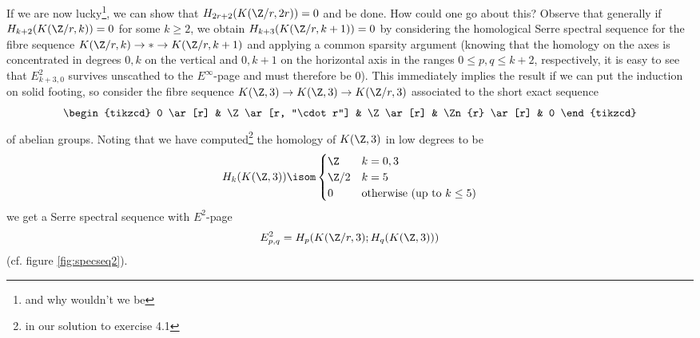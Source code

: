 \begin{solution}
	If we are now lucky\footnote{and why wouldn't we be}, we can show that $H_{2r + 2}(K(\Zn{r}, 2r)) = 0$ and be done.
	How could one go about this?
	Observe that generally if $H_{k + 2}(K(\Zn{r}, k)) = 0$ for some $k \geq 2$, we obtain $H_{k + 3}(K(\Zn{r}, k + 1)) = 0$ by considering the homological Serre spectral sequence for the fibre sequence $K(\Zn{r}, k) \to * \to K(\Zn{r}, k + 1)$ and applying a common sparsity argument (knowing that the homology on the axes is concentrated in degrees $0, k$  on the vertical and $0, k + 1$ on the horizontal axis in the ranges $0 \leq p, q \leq k + 2$, respectively, it is easy to see that $E^2_{k + 3, 0}$ survives unscathed to the $E^\infty$-page and must therefore be 0).
	This immediately implies the result if we can put the induction on solid footing, so consider the fibre sequence $K(\Z, 3) \to K(\Z, 3) \to K(\Zn{r}, 3)$ associated to the short exact sequence
	\begin{equation*}
		\begin{tikzcd}
			0 
					\ar[r]
				& \Z
					\ar[r, "\cdot r"]
				& \Z
					\ar[r]
				& \Zn{r}
					\ar[r]
				& 0
		\end{tikzcd}
	\end{equation*}
	of abelian groups.
	Noting that we have computed\footnote{in our solution to exercise 4.1} the homology of $K(\Z, 3)$ in low degrees to be
	\begin{equation*}
		H_k(K(\Z, 3)) \isom \begin{cases}
			\Z 		& k = 0, 3 \\
			\Zn{2} 	& k = 5 \\
			0 		& \text{otherwise (up to } k \leq 5\text{)}
		\end{cases}
	\end{equation*}
	we get a Serre spectral sequence with $E^2$-page
	\begin{equation*}
		E^2_{p, q} = H_p(K(\Zn{r}, 3); H_q(K(\Z, 3)))
	\end{equation*}
	(cf. figure \ref{fig:specseq2}).
	\begin{figure}[ht]
		\centering
\end{figure}
\end{solution}
